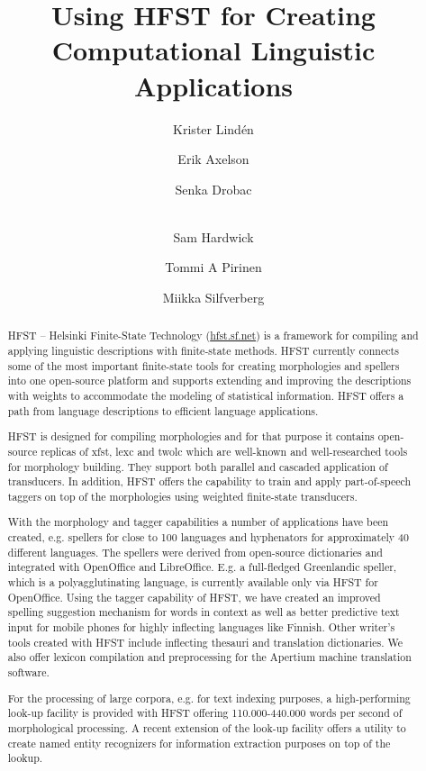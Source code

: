 \documentclass{llncs}
\begin{document}
%
\title{Using HFST for Creating Computational Linguistic Applications}
%
\author{Krister Lind\'{e}n \and Erik Axelson \and Senka Drobac \and\\
Sam Hardwick \and Tommi A Pirinen \and Miikka Silfverberg}


\maketitle

\begin{abstract}
\sloppy HFST – Helsinki Finite-State Technology (\url{hfst.sf.net})
is a framework for compiling and applying linguistic descriptions
with finite-state
methods. HFST currently connects some of the most important finite-state
tools for creating morphologies and spellers into one open-source
platform and supports extending and improving the descriptions with
weights to accommodate the modeling of statistical information. HFST
offers a path from language descriptions to efficient language
applications.

HFST is designed for compiling morphologies and for that purpose it
contains open-source replicas of xfst, lexc and twolc which are
well-known and well-researched tools for morphology building. They
support both parallel and cascaded application of transducers. In
addition, HFST offers the capability to train and apply part-of-speech
taggers on top of the morphologies using weighted finite-state transducers.

With the morphology and tagger capabilities a number of applications
have been created, e.g. spellers for close to 100 languages and
hyphenators for approximately 40 different languages. The spellers were
derived from open-source dictionaries and integrated with OpenOffice and
LibreOffice. E.g. a full-fledged Greenlandic speller, which is a
polyagglutinating language, is currently available only via HFST for
OpenOffice. Using the tagger capability of HFST, we have created an
improved spelling suggestion mechanism for words in context as well as
better predictive text input for mobile phones for highly inflecting
languages like Finnish. Other writer’s tools created with HFST include
inflecting thesauri and translation dictionaries. We also offer lexicon
compilation and preprocessing for the Apertium machine translation
software.

For the processing of large corpora, e.g. for text indexing purposes, a
high-performing look-up facility is provided with HFST offering
110.000-440.000 words per second of morphological processing. A recent
extension of the look-up facility offers a utility to create named
entity recognizers for information extraction purposes on top of the
lookup. 
\end{abstract}
\end{document}
